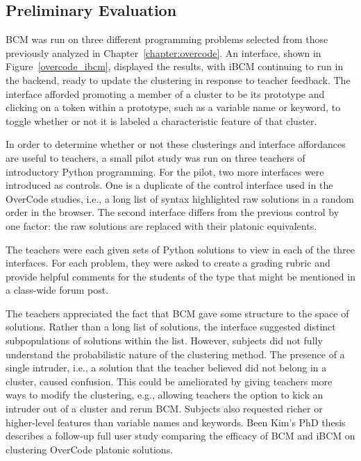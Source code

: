 \subsection{Preliminary Evaluation}

BCM was run on three different programming problems selected from those previously analyzed in Chapter~\ref{chapter:overcode}. An interface, shown in Figure~\ref{overcode_ibcm}, displayed the results, with iBCM continuing to run in the backend, ready to update the clustering in response to teacher feedback. The interface afforded promoting a member of a cluster to be its prototype and clicking on a token within a prototype, such as a variable name or keyword, to toggle whether or not it is labeled a characteristic feature of that cluster.

In order to determine whether or not these clusterings and interface affordances are useful to teachers, a small pilot study was run on three teachers of introductory Python programming. For the pilot, two more interfaces were introduced as controls. One is a duplicate of the control interface used in the OverCode studies, i.e., a long list of syntax highlighted raw solutions in a random order in the browser. The second interface differs from the previous control by one factor: the raw solutions are replaced with their platonic equivalents.

The teachers were each given sets of Python solutions to view in each of the three interfaces. For each problem, they were asked to create a grading rubric and provide helpful comments for the students of the type that might be mentioned in a class-wide forum post.



The teachers appreciated the fact that BCM gave some structure to the space of solutions. Rather than a long list of solutions, the interface suggested distinct subpopulations of solutions within the list. However, subjects did not fully understand the probabilistic nature of the clustering method. The presence of a single intruder, i.e., a solution that the teacher believed did not belong in a cluster, caused confusion. This could be ameliorated by giving teachers more ways to modify the clustering, e.g., allowing teachers the option to kick an intruder out of a cluster and rerun BCM. Subjects also requested richer or higher-level features than variable names and keywords. Been Kim's PhD thesis~\cite{beenthesis} describes a follow-up full user study comparing the efficacy of BCM and iBCM on clustering OverCode platonic solutions. 

